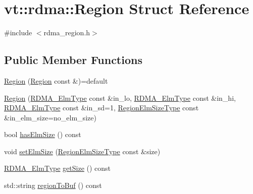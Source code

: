 \hypertarget{structvt_1_1rdma_1_1_region}{}\section{vt\+:\+:rdma\+:\+:Region Struct Reference}
\label{structvt_1_1rdma_1_1_region}


{\ttfamily \#include $<$rdma\+\_\+region.\+h$>$}

\subsection*{Public Member Functions}
\begin{DoxyCompactItemize}
\item 
\hyperlink{structvt_1_1rdma_1_1_region_a11155d9c0ffeb8c27adec32b609feb48}{Region} (\hyperlink{structvt_1_1rdma_1_1_region}{Region} const \&)=default
\item 
\hyperlink{structvt_1_1rdma_1_1_region_ad8ff4d0e314b0b0986fa8e0c23a0543b}{Region} (\hyperlink{namespacevt_a2c2a902092b72056f70210c159f966f0}{R\+D\+M\+A\+\_\+\+Elm\+Type} const \&in\+\_\+lo, \hyperlink{namespacevt_a2c2a902092b72056f70210c159f966f0}{R\+D\+M\+A\+\_\+\+Elm\+Type} const \&in\+\_\+hi, \hyperlink{namespacevt_a2c2a902092b72056f70210c159f966f0}{R\+D\+M\+A\+\_\+\+Elm\+Type} const \&in\+\_\+sd=1, \hyperlink{namespacevt_1_1rdma_ac07ef96e399913495fde1da0f83f684c}{Region\+Elm\+Size\+Type} const \&in\+\_\+elm\+\_\+size=no\+\_\+elm\+\_\+size)
\item 
bool \hyperlink{structvt_1_1rdma_1_1_region_a5cc8077a08a31b1662feac8a1a6c257e}{has\+Elm\+Size} () const
\item 
void \hyperlink{structvt_1_1rdma_1_1_region_a07d9d321ed359c24a18bfb2e4adc4f89}{set\+Elm\+Size} (\hyperlink{namespacevt_1_1rdma_ac07ef96e399913495fde1da0f83f684c}{Region\+Elm\+Size\+Type} const \&size)
\item 
\hyperlink{namespacevt_a2c2a902092b72056f70210c159f966f0}{R\+D\+M\+A\+\_\+\+Elm\+Type} \hyperlink{structvt_1_1rdma_1_1_region_afbd46473558c9c4f4469023cbf7e6d80}{get\+Size} () const
\item 
std\+::string \hyperlink{structvt_1_1rdma_1_1_region_aaeee36dc5369321c39d2f5d7a377d8f5}{region\+To\+Buf} () const
\end{DoxyCompactItemize}
